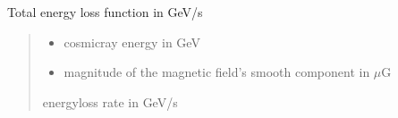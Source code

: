 \documentclass[letterpaper,10pt,english]{sphinxmanual}
\begin{document}

\begin{fulllineitems}
\label{\detokenize{diffsph.spectra:diffsph.spectra.analytics.btot}}
\pysigstartsignatures
{}
\pysigstopsignatures
\sphinxAtStartPar
Total energy loss function in GeV/s
\begin{quote}\begin{description}
\begin{itemize}
\item {} 
\sphinxAtStartPar
{} \textendash{} cosmic\sphinxhyphen{}ray energy in GeV

\item {} 
\sphinxAtStartPar
{} \textendash{} magnitude of the magnetic field’s smooth component in \(\mu\)G

\end{itemize}

\sphinxAtStartPar
energy\sphinxhyphen{}loss rate in GeV/s

\end{description}\end{quote}

\end{fulllineitems}

\end{document}
